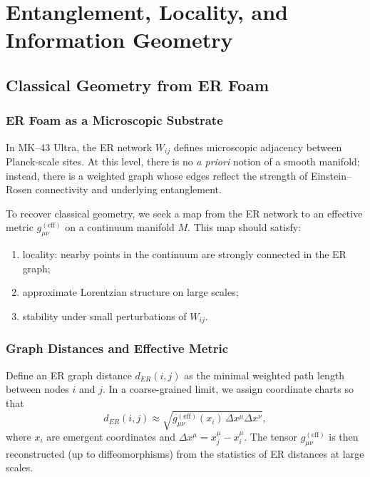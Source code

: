 

\part{Entanglement, Locality, and Information Geometry}

\chapter{Classical Geometry from ER Foam}

\section{ER Foam as a Microscopic Substrate}

In MK--43 Ultra, the ER network $W_{ij}$ defines microscopic adjacency between Planck-scale sites.
At this level, there is no \emph{a priori} notion of a smooth manifold; instead, there is a weighted graph whose edges reflect the strength of Einstein--Rosen connectivity and underlying entanglement.

To recover classical geometry, we seek a map from the ER network to an effective metric $g_{\mu\nu}^{\mathrm{(eff)}}$ on a continuum manifold $M$.
This map should satisfy:
\begin{enumerate}
  \item locality: nearby points in the continuum are strongly connected in the ER graph;
  \item approximate Lorentzian structure on large scales;
  \item stability under small perturbations of $W_{ij}$.
\end{enumerate}

\section{Graph Distances and Effective Metric}

Define an ER graph distance $d_{ER}(i,j)$ as the minimal weighted path length between nodes $i$ and $j$.
In a coarse-grained limit, we assign coordinate charts so that
\[
  d_{ER}(i,j) \approx \sqrt{g_{\mu\nu}^{\mathrm{(eff)}}(x_i)\,\Delta x^\mu\Delta x^\nu},
\]
where $x_i$ are emergent coordinates and $\Delta x^\mu = x_j^\mu - x_i^\mu$.
The tensor $g_{\mu\nu}^{\mathrm{(eff)}}$ is then reconstructed (up to diffeomorphisms) from the statistics of ER distances at large scales.

